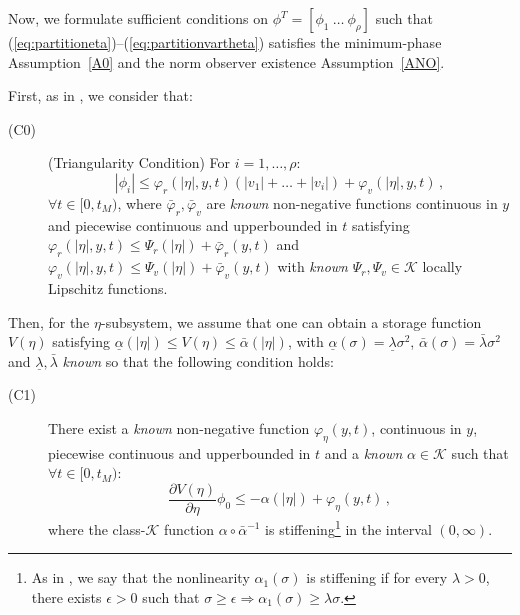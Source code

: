 \documentclass{rncauth}
\begin{document}

Now, we formulate sufficient conditions on $\phi^T\!=\![\phi_{1} \
\ldots \ \phi_{\rho}]$ such that
(\ref{eq:partitioneta})--(\ref{eq:partitionvartheta}) satisfies
the minimum-phase Assumption~\ref{A0} and the norm observer
existence Assumption~\ref{ANO}.

First, as in \cite{QL:02}\cite{PJ:04}\cite{CL:05}, we consider
that:
%
\begin{description}
\item[(C0)] (Triangularity Condition) For $i=1, \ldots, \rho$:
%
$$|\phi_{i}| \leq \varphi_r(|\eta|,y,t) (|v_1| + \ldots + |v_i|)+ \varphi_v(|\eta|,y,t)\,,$$
%
$\forall t\!\in\![0,t_M)$, where $\bar{\varphi}_r,\bar{\varphi}_v$
are {\em known} non-negative functions continuous in $y$ and
piecewise continuous and upperbounded in $t$ satisfying
$\varphi_r(|\eta|,y,t)\!\leq\!\Psi_r(|\eta|)+\bar{\varphi}_r(y,t)$
and
$\varphi_v(|\eta|,y,t)\!\leq\!\Psi_v(|\eta|)+\bar{\varphi}_v(y,t)$
with {\em known} $\Psi_r,\Psi_v\!\in\!\mathcal{K}$ locally
Lipschitz functions.
\end{description}
%
Then, for the $\eta$-subsystem, we assume that one can obtain a
storage function $V(\eta)$ satisfying $\underline{\alpha}(|\eta|)
\!\leq\! V(\eta)\!\leq\!\bar{\alpha}(|\eta|)$, with
$\underline{\alpha}(\sigma)\!=\!\underline{\lambda} \sigma^2$,
$\bar{\alpha}(\sigma)\!=\!\bar{\lambda} \sigma^2$ and
$\underline{\lambda},\bar{\lambda}$ {\em known} so that the
following condition holds:
%
\begin{description}
\item[(C1)] There exist a {\em known} non-negative function
$\varphi_\eta(y,t)$, continuous in $y$, piecewise continuous and
upperbounded in $t$ and a {\em known} $\alpha \in \mathcal{K}$
such that $\forall t \in [0,t_M)$:
%
\begin{equation}
\frac{\partial V(\eta)}{\partial \eta} \phi_0 \leq
-\alpha(|\eta|)+\varphi_\eta(y,t)\,,\label{eq:ISSLyapunov}
\end{equation}
%
where the class-$\mathcal{K}$ function $\alpha \circ
\bar{\alpha}^{-1}$ is stiffening\footnote{As in \cite{ALK:02}, we
say that the nonlinearity $\alpha_1(\sigma)$ is stiffening if for
every $\lambda>0$, there exists $\epsilon>0$ such that $\sigma
\geq \epsilon \Rightarrow \alpha_1(\sigma) \geq \lambda \sigma$.}
in the interval $(0,\infty)$.%
%
\end{description}
\end{document}
